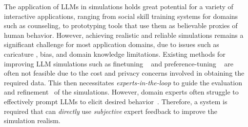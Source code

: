 \documentclass[11pt]{article}
\begin{document}
The application of LLMs in simulations holds great potential for a variety of interactive applications, ranging from social skill training systems \cite{yang2024social} for domains such as counseling, to prototyping tools that use them as believable proxies of human behavior. However, achieving realistic and reliable simulations remains a significant challenge for most application domains, due to issues such as caricature \cite{cheng-etal-2023-compost}, bias, and domain knowledge limitations. Existing methods for improving LLM simulations such as finetuning ~\cite{demasi-etal-2020-multi} and preference-tuning ~\cite{rafailov2024direct} are often not feasible due to the cost and privacy concerns involved in obtaining the required data. This then necessitates \textit{experts-in-the-loop} to guide the evaluation and refinement~\cite{chen2023llmempowered, stapleton2023seeing} of the simulations. However, domain experts often struggle to effectively prompt LLMs to elicit desired behavior~\cite{petridis2023constitutionmaker}. Therefore, a system is required that can \textit{directly} use \textit{subjective} expert feedback to improve the simulation realism. 
\fi

\end{document}

